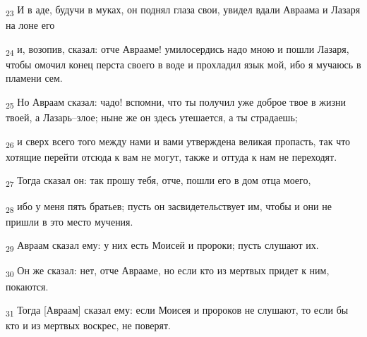 \begin{tcolorbox}
\textsubscript{23} И в аде, будучи в муках, он поднял глаза свои, увидел вдали Авраама и Лазаря на лоне его
\end{tcolorbox}
\begin{tcolorbox}
\textsubscript{24} и, возопив, сказал: отче Аврааме! умилосердись надо мною и пошли Лазаря, чтобы омочил конец перста своего в воде и прохладил язык мой, ибо я мучаюсь в пламени сем.
\end{tcolorbox}
\begin{tcolorbox}
\textsubscript{25} Но Авраам сказал: чадо! вспомни, что ты получил уже доброе твое в жизни твоей, а Лазарь--злое; ныне же он здесь утешается, а ты страдаешь;
\end{tcolorbox}
\begin{tcolorbox}
\textsubscript{26} и сверх всего того между нами и вами утверждена великая пропасть, так что хотящие перейти отсюда к вам не могут, также и оттуда к нам не переходят.
\end{tcolorbox}
\begin{tcolorbox}
\textsubscript{27} Тогда сказал он: так прошу тебя, отче, пошли его в дом отца моего,
\end{tcolorbox}
\begin{tcolorbox}
\textsubscript{28} ибо у меня пять братьев; пусть он засвидетельствует им, чтобы и они не пришли в это место мучения.
\end{tcolorbox}
\begin{tcolorbox}
\textsubscript{29} Авраам сказал ему: у них есть Моисей и пророки; пусть слушают их.
\end{tcolorbox}
\begin{tcolorbox}
\textsubscript{30} Он же сказал: нет, отче Аврааме, но если кто из мертвых придет к ним, покаются.
\end{tcolorbox}
\begin{tcolorbox}
\textsubscript{31} Тогда [Авраам] сказал ему: если Моисея и пророков не слушают, то если бы кто и из мертвых воскрес, не поверят.
\end{tcolorbox}
